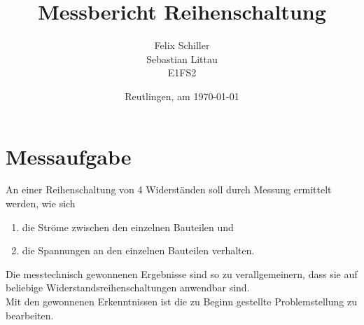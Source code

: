 \documentclass[
a4paper,     %
12pt         %
]{scrartcl}  %
\title{Messbericht Reihenschaltung}
\author{Felix Schiller \\ Sebastian Littau \\ E1FS2}
\date{Reutlingen, am \today{}}
\begin{document}

\maketitle

\newpage
\tableofcontents





\section{Messaufgabe}
An einer Reihenschaltung von 4 Widerständen soll durch Messung ermittelt werden, wie sich 
\begin{enumerate}
\begin{enumerate}
	\item die Ströme zwischen den einzelnen Bauteilen und 
	\item die Spannungen an den einzelnen Bauteilen verhalten. 
\end{enumerate}
\end{enumerate}
Die messtechnisch gewonnenen Ergebnisse sind so zu verallgemeinern, dass sie auf beliebige Widerstandsreihenschaltungen anwendbar sind. \\
Mit den gewonnenen Erkenntnissen ist die zu Beginn gestellte Problemstellung zu bearbeiten.
\end{document}
